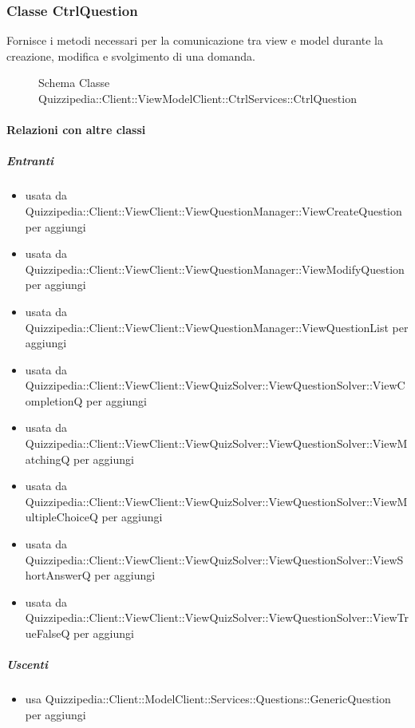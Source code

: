 \subsubsection{Classe CtrlQuestion}
Fornisce i metodi necessari per la comunicazione tra view e model durante la creazione, modifica e svolgimento di una domanda.
\begin{figure}[H]
\centering
\noindent{}
\caption[Schema Classe CtrlQuestion]{Schema Classe Quizzipedia::Client::ViewModelClient::CtrlServices::CtrlQuestion}
\end{figure}
\paragraph{Relazioni con altre classi}
\subparagraph{Entranti}
\begin{itemize}
\item usata da Quizzipedia::Client::ViewClient::ViewQuestionManager::ViewCreateQuestion per aggiungi
\item usata da Quizzipedia::Client::ViewClient::ViewQuestionManager::ViewModifyQuestion per aggiungi
\item usata da Quizzipedia::Client::ViewClient::ViewQuestionManager::ViewQuestionList per aggiungi
\item usata da Quizzipedia::Client::ViewClient::ViewQuizSolver::ViewQuestionSolver::ViewCompletionQ per aggiungi
\item usata da Quizzipedia::Client::ViewClient::ViewQuizSolver::ViewQuestionSolver::ViewMatchingQ per aggiungi
\item usata da Quizzipedia::Client::ViewClient::ViewQuizSolver::ViewQuestionSolver::ViewMultipleChoiceQ per aggiungi
\item usata da Quizzipedia::Client::ViewClient::ViewQuizSolver::ViewQuestionSolver::ViewShortAnswerQ per aggiungi
\item usata da Quizzipedia::Client::ViewClient::ViewQuizSolver::ViewQuestionSolver::ViewTrueFalseQ per aggiungi
\end{itemize}
\subparagraph{Uscenti}
\begin{itemize}
\item usa Quizzipedia::Client::ModelClient::Services::Questions::GenericQuestion per aggiungi
\end{itemize}
